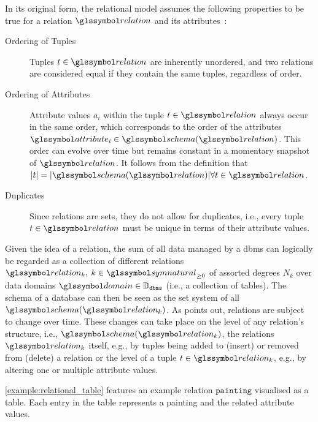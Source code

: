 In its original form, the relational model assumes the following properties to be true for a relation $\relation$ and its attributes~\cite{Codd:1970Relational}:

\begin{description}
    \item[Ordering of Tuples] Tuples $t \in \relation$ are inherently unordered, and two relations are considered equal if they contain the same tuples, regardless of order.
    \item[Ordering of Attributes] Attribute values $a_{i}$ within the tuple $t \in \relation$ always occur in the same order, which corresponds to the order of the attributes $\attribute_i \in \schema(\relation)$. This order can evolve over time but remains constant in a momentary snapshot of $\relation$. It follows from the definition that $|t| = |\schema(\relation)| \forall t \in \relation$.
    \item[Duplicates] Since relations are sets, they do not allow for duplicates, i.e., every tuple $t \in \relation$ must be unique in terms of their attribute values.
\end{description}

Given the idea of a relation, the sum of all data managed by a \acrshort{dbms} can logically be regarded as a collection of different relations $\relation_k, \: k \in \symnatural_{\geq 0}$ of assorted degrees $N_k$ over data domains $\domain \in \mathbb{D}_{\mathtt{dbms}}$ (i.e., a collection of tables). The schema of a database can then be seen as the set system of all $\schema(\relation_k)$. As \cite{Codd:1970Relational} points out, relations are subject to change over time. These changes can take place on the level of any relation's structure, i.e., $\schema(\relation_k)$, the relations $\relation_k$ itself, e.g., by tuples being added to (insert) or removed from (delete) a relation or the level of a tuple $t \in \relation_k$, e.g., by altering one or multiple attribute values.

\cref{example:relational_table} features an example relation $\mathtt{painting}$ visualised as a table. Each entry in the table represents a painting and the related attribute values.

